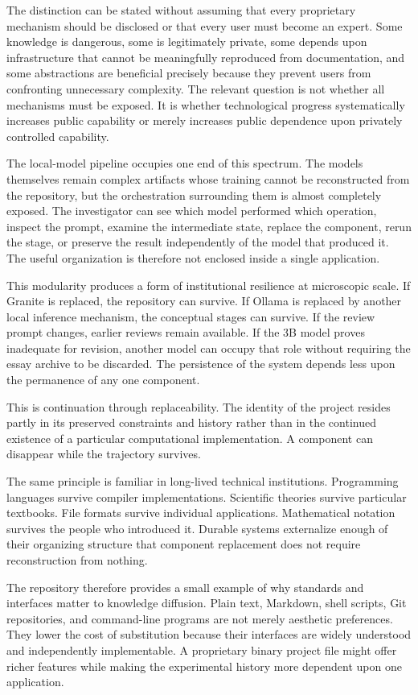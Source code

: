 \documentclass[11pt]{article}
\begin{document}
The distinction can be stated without assuming that every proprietary mechanism should be disclosed or that every user must become an expert. Some knowledge is dangerous, some is legitimately private, some depends upon infrastructure that cannot be meaningfully reproduced from documentation, and some abstractions are beneficial precisely because they prevent users from confronting unnecessary complexity. The relevant question is not whether all mechanisms must be exposed. It is whether technological progress systematically increases public capability or merely increases public dependence upon privately controlled capability.

The local-model pipeline occupies one end of this spectrum. The models themselves remain complex artifacts whose training cannot be reconstructed from the repository, but the orchestration surrounding them is almost completely exposed. The investigator can see which model performed which operation, inspect the prompt, examine the intermediate state, replace the component, rerun the stage, or preserve the result independently of the model that produced it. The useful organization is therefore not enclosed inside a single application.

This modularity produces a form of institutional resilience at microscopic scale. If Granite is replaced, the repository can survive. If Ollama is replaced by another local inference mechanism, the conceptual stages can survive. If the review prompt changes, earlier reviews remain available. If the 3B model proves inadequate for revision, another model can occupy that role without requiring the essay archive to be discarded. The persistence of the system depends less upon the permanence of any one component.

This is continuation through replaceability. The identity of the project resides partly in its preserved constraints and history rather than in the continued existence of a particular computational implementation. A component can disappear while the trajectory survives.

The same principle is familiar in long-lived technical institutions. Programming languages survive compiler implementations. Scientific theories survive particular textbooks. File formats survive individual applications. Mathematical notation survives the people who introduced it. Durable systems externalize enough of their organizing structure that component replacement does not require reconstruction from nothing.

The repository therefore provides a small example of why standards and interfaces matter to knowledge diffusion. Plain text, Markdown, shell scripts, Git repositories, and command-line programs are not merely aesthetic preferences. They lower the cost of substitution because their interfaces are widely understood and independently implementable. A proprietary binary project file might offer richer features while making the experimental history more dependent upon one application.
\end{document}
